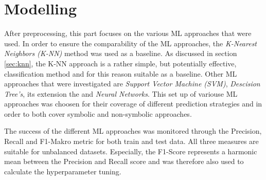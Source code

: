 \chapter{Modelling}\label{sec:data_mining}





After preprocessing, this part focuses on the various ML approaches that were used. In order to ensure the comparability of the ML approaches, the \textit{K-Nearest Neighbors (K-NN)} method was used as a baseline. As discussed in section \ref{sec:knn}, the K-NN approach is a rather simple, but potentially effective, classification method and for this reason suitable as a baseline. Other ML approaches that were investigated are \textit{Support Vector Machine (SVM)}, \textit{Descision Tree's}, its extension the  and \textit{Neural Networks}. This set up of variouse ML approaches was choosen for their coverage of different prediction strategies and in order to both cover symbolic and non-symbolic approaches.

The success of the different ML approaches was monitored through the Precision, Recall and F1-Makro metric for both train and test data. All three measures are suitable for unbalanced datasets. \citep{Brownlee2020} Especially, the F1-Score represents a harmonic mean between the Precision and Recall score and was therefore also used to calculate the hyperparameter tuning.\citep{Peltarion2021}


